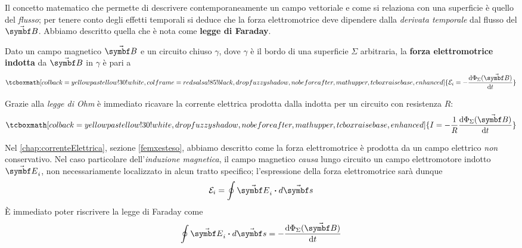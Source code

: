 Il concetto matematico che permette di descrivere contemporaneamente un campo vettoriale e come si relaziona con una superficie è quello del \textit{flusso}; per tenere conto degli effetti temporali si deduce che la forza elettromotrice deve dipendere dalla \textit{derivata temporale} dal flusso del $\vba{B}$. Abbiamo descritto quella che è nota come \textbf{legge di Faraday}.
\begin{theorema}
	Dato un campo magnetico $\vba{B}$ e un circuito chiuso $\gamma$, dove $\gamma$ è il bordo di una superficie $\Sigma$ arbitraria, la \textbf{forza elettromotrice indotta} da $\vba{B}$ in $\gamma$ è pari a
	\begin{equation}
		\tcboxmath[colback=yellowpastellow!30!white,colframe=redsalsa!85!black,drop fuzzy shadow, nobeforeafter, math upper, tcbox raise base, enhanced]{\mathcal{E}_i=-\dv{\Phi_\Sigma (\vba B)}{t}}
	\end{equation}
\end{theorema}
Grazie alla \textit{legge di Ohm} è immediato ricavare la corrente elettrica prodotta dalla \fem indotta per un circuito con resistenza $R$:
\begin{equation}
	\tcboxmath[colback=yellowpastellow!30!white,drop fuzzy shadow, nobeforeafter, math upper, tcbox raise base, enhanced]{I=-\frac{1}{R}\dv{\Phi_\Sigma(\vba B)}{t}}
\end{equation}

\begin{observe}
	Nel \autoref{chap:correnteElettrica}, sezione \ref{femxesteso}, abbiamo descritto come la forza elettromotrice è prodotta da un campo elettrico \textit{non} conservativo. Nel caso particolare dell'\textit{induzione magnetica}, il campo magnetico \textit{causa} lungo circuito un campo elettromotore indotto $\vba{E}_i$, non necessariamente localizzato in alcun tratto specifico; l'espressione della forza elettromotrice sarà dunque
	\begin{equation*}
		\mathcal{E}_i=\oint\vba{E}_i\vdot d\vba{s}
	\end{equation*}
	È immediato poter riscrivere la legge di Faraday come
	\begin{equation}
		\oint \vba E_i\vdot d\vba s =-\dv{\Phi_{\Sigma}(\vba B)}{t}		
	\end{equation}
\end{observe}
